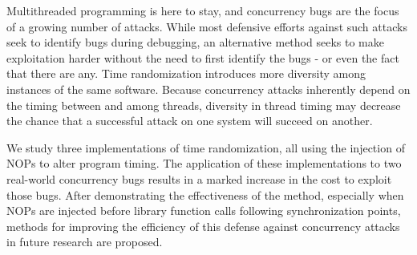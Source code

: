 Multithreaded programming is here to stay, and concurrency bugs are the focus of a growing number of attacks.
While most defensive efforts against such attacks seek to identify bugs during debugging, an alternative method seeks to make exploitation harder without the need to first identify the bugs - or even the fact that there are any.
Time randomization introduces more diversity among instances of the same software.
Because concurrency attacks inherently depend on the timing between and among threads, diversity in thread timing may decrease the chance that a successful attack on one system will succeed on another.

We study three implementations of time randomization, all using the injection of NOPs to alter program timing.
The application of these implementations to two real-world concurrency bugs results in a marked increase in the cost to exploit those bugs.
After demonstrating the effectiveness of the method, especially when NOPs are injected before library function calls following synchronization points, methods for improving the efficiency of this defense against concurrency attacks in future research are proposed.